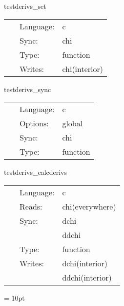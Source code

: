 \vspace{5mm}


\hspace{5mm} testderivs\_set 

\hspace{5mm}{\it set up test data } 


\hspace{5mm}

 \begin{tabular*}{160mm}{cll} 
~ & Language:  & c \\ 
~ & Sync:  & chi \\ 
~ & Type:  & function \\ 
~ & Writes:  & chi(interior) \\ 
\end{tabular*} 


\vspace{5mm}


\hspace{5mm} testderivs\_sync 

\hspace{5mm}{\it synchronize } 


\hspace{5mm}

 \begin{tabular*}{160mm}{cll} 
~ & Language:  & c \\ 
~ & Options:  & global \\ 
~ & Sync:  & chi \\ 
~ & Type:  & function \\ 
\end{tabular*} 


\vspace{5mm}


\hspace{5mm} testderivs\_calcderivs 

\hspace{5mm}{\it calculate derivs } 


\hspace{5mm}

 \begin{tabular*}{160mm}{cll} 
~ & Language:  & c \\ 
~ & Reads:  & chi(everywhere) \\ 
~ & Sync:  & dchi \\ 
~& ~ &ddchi\\ 
~ & Type:  & function \\ 
~ & Writes:  & dchi(interior) \\ 
~& ~ &ddchi(interior)\\ 
\end{tabular*} 



\vspace{5mm}\parskip = 10pt 

